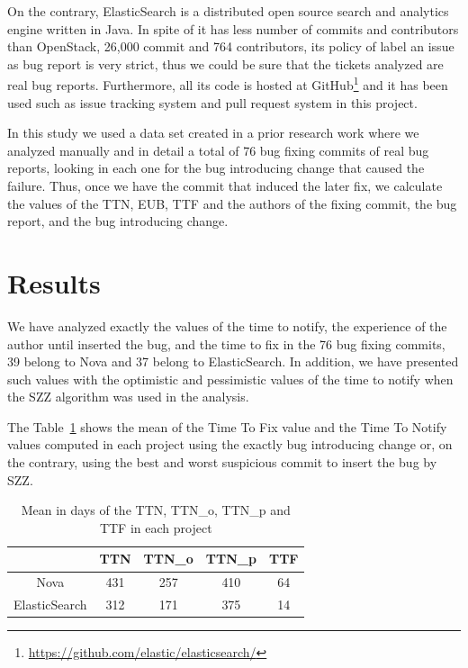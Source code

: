 \documentclass[10pt, conference]{IEEEtran}
\begin{document}
On the contrary, ElasticSearch is a distributed open source search and analytics engine written in Java. In spite of it has less number of commits and contributors than OpenStack, 26,000 commit and 764 contributors, its policy of label an issue as bug report is very strict, thus we could be sure that the tickets analyzed are real bug reports. Furthermore, all its code is hosted at GitHub\footnote{\url{https://github.com/elastic/elasticsearch/}} and it  has been used such as issue tracking system and pull request system in this project.

In this study we used a data set created in a prior research work where we analyzed manually and in detail a total of 76 bug fixing commits of real bug reports, looking in each one for the bug introducing change that caused the failure. Thus, once we have the commit that induced the later fix, we calculate the values of the TTN, EUB, TTF and the authors of the fixing commit, the bug report, and the bug introducing change.  

\section{Results}
\label{sec:results}

We have analyzed exactly the values of the time to notify, the experience of the author until inserted the bug, and the time to fix in the 76 bug fixing commits, 39 belong to Nova and 37 belong to ElasticSearch.  In addition, we have presented such values with the optimistic and pessimistic values of the time to notify when the SZZ algorithm was used in the analysis.

The Table~\ref{table} shows the mean of the Time To Fix value and the Time To Notify values computed in each project using the exactly bug introducing change or, on the contrary, using the best and worst suspicious commit to insert the bug by SZZ.  
\begin{table}[!t]
\renewcommand{\arraystretch}{1.3}
\label{table}
\centering
\caption{Mean in days of the TTN, TTN\_o, TTN\_p and TTF in each project}
\begin{tabular}{|c||c||c||c||c| }
\hline
  & TTN & TTN\_o & TTN\_p & TTF \\
\hline
Nova & 431 & 257 & 410 & 64 \\
\hline
ElasticSearch & 312 & 171 & 375 & 14\\
\hline
\end{tabular}
\end{table}
\end{document}
